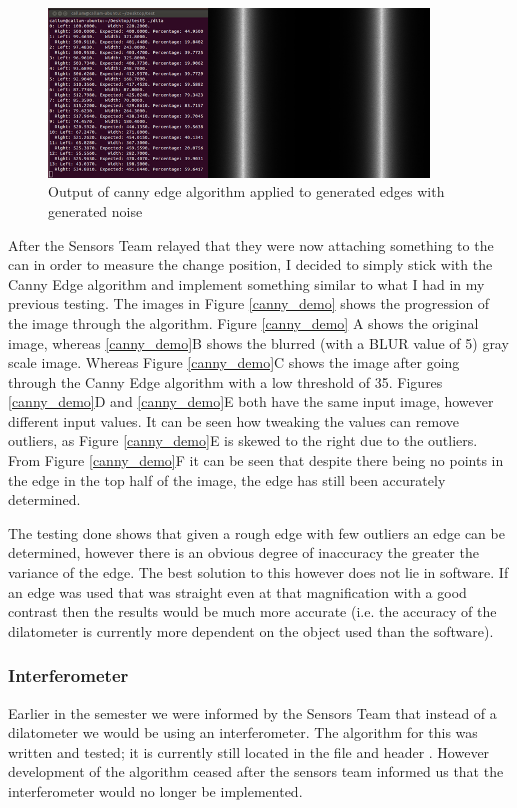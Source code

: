 \begin{figure}[H]
	\centering
	\includegraphics[width=0.9\textwidth]{figures/canny_edges_noise.png}
	\caption{Output of canny edge algorithm applied to generated edges with generated noise} 
	\label{canny_edges_noise.png}
\end{figure}

After the Sensors Team relayed that they were now attaching something to the can in order to measure the change position, I decided to simply stick with the Canny Edge algorithm and implement something similar to what I had in my previous testing.  The images in Figure \ref{canny_demo} shows the progression of the image through the algorithm.  Figure \ref{canny_demo} A shows the original image, whereas \ref{canny_demo}B shows the blurred (with a BLUR value of 5) gray scale image.  Whereas Figure \ref{canny_demo}C shows the image after going through the Canny Edge algorithm with a low threshold of 35.   Figures \ref{canny_demo}D and \ref{canny_demo}E both have the same input image, however different input values.  It can be seen how tweaking the values can remove outliers, as Figure \ref{canny_demo}E is skewed to the right due to the outliers.  From Figure \ref{canny_demo}F it can be seen that despite there being no points in the edge in the top half of the image, the edge has still been accurately determined.  

The testing done shows that given a rough edge with few outliers an edge can be determined, however there is an obvious degree of inaccuracy the greater the variance of the edge. The best solution to this however does not lie in software.  If an edge was used that was straight even at that magnification with a good contrast then the results would be much more accurate (i.e. the accuracy of the dilatometer is currently more dependent on the object used than the software). 

\subsubsection{Interferometer}
Earlier in the semester we were informed by the Sensors Team that instead of a dilatometer we would be using an interferometer.  The algorithm for this was written and tested; it is currently still located in the file  and header . However development of the algorithm ceased after the sensors team informed us that the interferometer would no longer be implemented.

